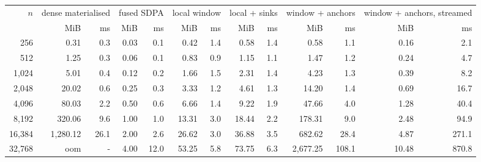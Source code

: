 \begin{tabular}{rrrrrrrrrrrrr}
\toprule
$n$ & \multicolumn{2}{c}{dense materialised} & \multicolumn{2}{c}{fused SDPA} & \multicolumn{2}{c}{local window} & \multicolumn{2}{c}{local + sinks} & \multicolumn{2}{c}{window + anchors} & \multicolumn{2}{c}{window + anchors, streamed} \\
 & MiB & ms & MiB & ms & MiB & ms & MiB & ms & MiB & ms & MiB & ms \\
\midrule
256 & 0.31 & 0.3 & 0.03 & 0.1 & 0.42 & 1.4 & 0.58 & 1.4 & 0.58 & 1.1 & 0.16 & 2.1 \\
512 & 1.25 & 0.3 & 0.06 & 0.1 & 0.83 & 0.9 & 1.15 & 1.1 & 1.47 & 1.2 & 0.24 & 4.7 \\
1{,}024 & 5.01 & 0.4 & 0.12 & 0.2 & 1.66 & 1.5 & 2.31 & 1.4 & 4.23 & 1.3 & 0.39 & 8.2 \\
2{,}048 & 20.02 & 0.6 & 0.25 & 0.3 & 3.33 & 1.2 & 4.61 & 1.3 & 14.20 & 1.4 & 0.69 & 16.7 \\
4{,}096 & 80.03 & 2.2 & 0.50 & 0.6 & 6.66 & 1.4 & 9.22 & 1.9 & 47.66 & 4.0 & 1.28 & 40.4 \\
8{,}192 & 320.06 & 9.6 & 1.00 & 1.0 & 13.31 & 3.0 & 18.44 & 2.2 & 178.31 & 9.0 & 2.48 & 94.9 \\
16{,}384 & 1{,}280.12 & 26.1 & 2.00 & 2.6 & 26.62 & 3.0 & 36.88 & 3.5 & 682.62 & 28.4 & 4.87 & 271.1 \\
32{,}768 & oom & - & 4.00 & 12.0 & 53.25 & 5.8 & 73.75 & 6.3 & 2{,}677.25 & 108.1 & 10.48 & 870.8 \\
\bottomrule
\end{tabular}
